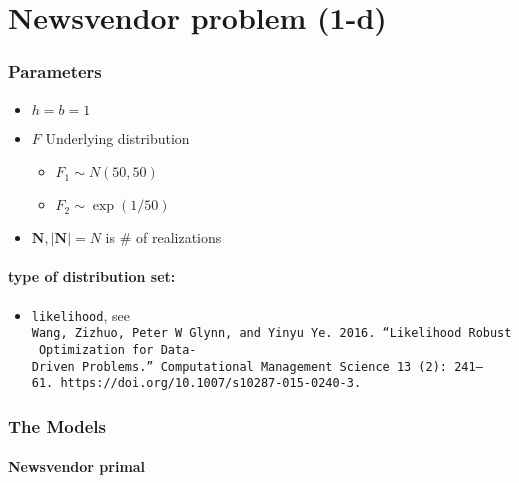 \documentclass[
  10pt,
  a4paper,
,tablecaptionabove
]{scrartcl}
\author{Chuwen Zhang}
\date{}
\title{}
\author{Chuwen Zhang}
\providecommand{\tightlist}{%
  \setlength{\itemsep}{0pt}\setlength{\parskip}{0pt}}
\begin{document}




\hypertarget{newsvendor-problem-1-d}{%
\section{Newsvendor problem (1-d)}\label{newsvendor-problem-1-d}}

\hypertarget{parameters}{%
\subsubsection{Parameters}\label{parameters}}

\begin{itemize}
\tightlist
\item
  \(h=b=1\)
\item
  \(F\) Underlying distribution

  \begin{itemize}
  \tightlist
  \item
    \(F_1 \sim N(50, 50)\)
  \item
    \(F_2 \sim \exp(1/50)\)
  \end{itemize}
\item
  \(\mathbf N, |\mathbf N| = N\) is \# of realizations
\end{itemize}

\hypertarget{type-of-distribution-set}{%
\paragraph{type of distribution set:}\label{type-of-distribution-set}}

\begin{itemize}
\tightlist
\item
  \texttt{likelihood}, see
  \texttt{Wang,\ Zizhuo,\ Peter\ W\ Glynn,\ and\ Yinyu\ Ye.\ 2016.\ “Likelihood\ Robust\ Optimization\ for\ Data-Driven\ Problems.”\ Computational\ Management\ Science\ 13\ (2):\ 241–61.\ https://doi.org/10.1007/s10287-015-0240-3.}
\end{itemize}

\hypertarget{the-models}{%
\subsubsection{The Models}\label{the-models}}

\hypertarget{newsvendor-primal}{%
\paragraph{Newsvendor primal}\label{newsvendor-primal}}
\end{document}
